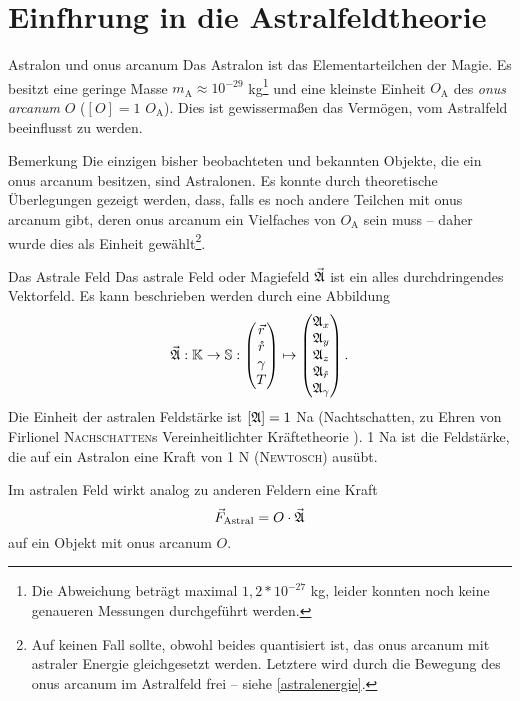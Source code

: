 \section[tocentry=Einführung in die Astralfeldtheorie, head=Einführung in die Astralfeldtheorie]{Einf\uese hrung in die Astralfeldtheorie}
\begin{bla}{Astralon und onus arcanum}
Das Astralon ist das Elementarteilchen der Magie. Es besitzt eine geringe Masse $m_\text{A}\approx10^{-29}$ kg\footnote{Die Abweichung beträgt maximal $1,2*10^{-27}$ kg, leider konnten noch keine genaueren Messungen durchgeführt werden.} und eine kleinste Einheit $O_\text{A}$ des \emph{onus arcanum} $O$ ($[O]=1$ $O_\text{A}$). Dies ist gewissermaßen das Vermögen, vom Astralfeld beeinflusst zu werden.
\end{bla}
\begin{bla}{Bemerkung}
Die einzigen bisher beobachteten und bekannten Objekte, die ein onus arcanum besitzen, sind Astralonen. Es konnte durch theoretische Überlegungen \cite{quanten} gezeigt werden, dass, falls es noch andere Teilchen mit onus arcanum gibt, deren onus arcanum ein Vielfaches von $O_\text{A}$ sein muss -- daher wurde dies als Einheit gewählt\footnote{Auf keinen Fall sollte, obwohl beides quantisiert ist, das onus arcanum mit astraler Energie gleichgesetzt werden. Letztere wird durch die Bewegung des onus arcanum im Astralfeld frei -- siehe \ref{astralenergie}.}.
\end{bla}
\begin{bla}{Das Astrale Feld}
Das astrale Feld oder Magiefeld $\vec{\mathfrak{A}}$ ist ein alles durchdringendes Vektorfeld. Es kann beschrieben werden durch eine Abbildung
\begin{equation}
\vec{\mathfrak{A}}: \mathbb{K}\to\mathbb{S}: \begin{pmatrix}\vec{r}\\\mathring{r}\\\gamma\\T\end{pmatrix}\mapsto\begin{pmatrix}\mathfrak{A}_x\\\mathfrak{A}_y\\\mathfrak{A}_z\\\mathfrak{A}_{\mathring{r}}\\\mathfrak{A}_\gamma\end{pmatrix}\text{.}
\end{equation}
Die Einheit der astralen Feldstärke ist $[\mathfrak{A}]=1$ Na (Nachtschatten, zu Ehren von Firlionel \textsc{Nachschatten}s Vereinheitlichter Kräftetheorie \cite{nachtschatten}). 1 Na ist die Feldstärke, die auf ein Astralon eine Kraft von 1 N (\textsc{Newtosch}) ausübt.

Im astralen Feld wirkt analog zu anderen Feldern eine Kraft
\begin{equation}
\vec{F}_\text{Astral}=O\cdot\vec{\mathfrak{A}}\label{eq:astralkraft}
\end{equation}
auf ein Objekt mit onus arcanum $O$.
\end{bla}
